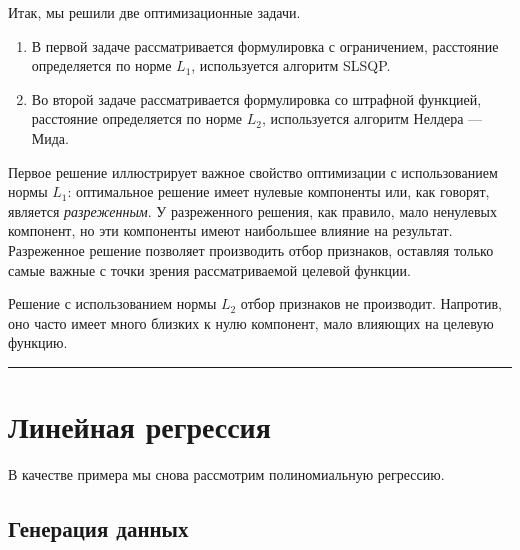 \documentclass[11pt,a4paper]{article}
\renewcommand{\linethickness}{0.1ex}
\providecommand{\tightlist}{%
      \setlength{\itemsep}{0pt}\setlength{\parskip}{0pt}}
\begin{document}
    \begin{center}
    \end{center}
    
    Итак, мы решили две оптимизационные задачи.

\begin{enumerate}
\def\labelenumi{\arabic{enumi}.}
\tightlist
\item
  В первой задаче рассматривается формулировка с ограничением,
  расстояние определяется по норме \(L_1\), используется алгоритм SLSQP.
\item
  Во второй задаче рассматривается формулировка со штрафной функцией,
  расстояние определяется по норме \(L_2\), используется алгоритм
  Нелдера --- Мида.
\end{enumerate}

Первое решение иллюстрирует важное свойство оптимизации с использованием
нормы \(L_1\): оптимальное решение имеет нулевые компоненты или, как говорят, является \emph{разреженным}.
У разреженного решения, как правило, мало ненулевых компонент, но эти компоненты имеют наибольшее влияние на результат.
Разреженное решение позволяет производить отбор признаков, оставляя только самые важные с точки зрения рассматриваемой целевой функции.

Решение с использованием нормы \(L_2\) отбор признаков не производит.
Напротив, оно часто имеет много близких к нулю компонент, мало влияющих на целевую функцию.

    \begin{center}\rule{0.5\linewidth}{\linethickness}\end{center}

    \hypertarget{ux43bux438ux43dux435ux439ux43dux430ux44f-ux440ux435ux433ux440ux435ux441ux441ux438ux44f}{%
\section{Линейная
регрессия}\label{ux43bux438ux43dux435ux439ux43dux430ux44f-ux440ux435ux433ux440ux435ux441ux441ux438ux44f}}

В качестве примера мы снова рассмотрим полиномиальную регрессию.

    \hypertarget{ux433ux435ux43dux435ux440ux430ux446ux438ux44f-ux434ux430ux43dux43dux44bux445}{%
\subsection{Генерация
данных}\label{ux433ux435ux43dux435ux440ux430ux446ux438ux44f-ux434ux430ux43dux43dux44bux445}}
\end{document}
